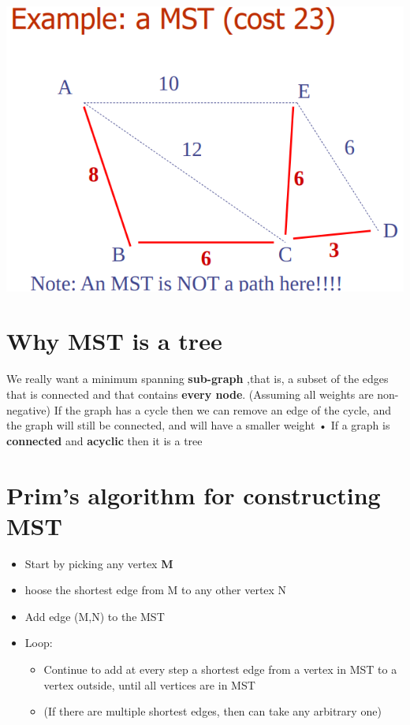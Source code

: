 \documentclass{article}
\begin{document}
\begin{center}
	\includegraphics[scale=0.3]{mst.png}
\end{center}
\section{Why MST is a tree}
\begin{flushleft}
We really want a minimum spanning \textbf{sub-graph} ,that is, a subset of the edges that is connected and that contains \textbf{every node}. (Assuming all weights are non-negative) If the graph has a cycle then we can remove an edge of the cycle, and the graph will still be connected, and will have a smaller weight • If a graph is \textbf{connected} and \textbf{acyclic} then it is a tree
\end{flushleft}

\section{Prim's algorithm for constructing MST}
\begin{itemize}
	\item Start by picking any vertex \textbf{M}
	\item hoose the shortest edge from M to any other vertex N
	\item Add edge (M,N) to the MST
	\item Loop:
	\begin{itemize}
		\item Continue to add at every step a shortest edge from a vertex in MST to a vertex outside, until all vertices are in MST
		\item (If there are multiple shortest edges, then can take any arbitrary one)
	\end{itemize}
\end{itemize}
\end{document}
